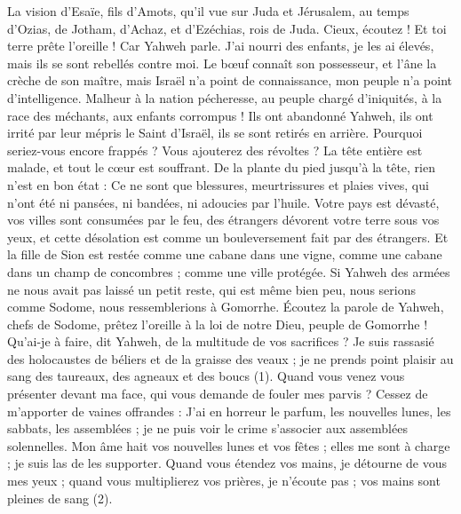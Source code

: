 \BFont
\begin{multicols}{2}
\VerseOne{}La vision d'Esaïe, fils d'Amots, qu’il vue sur Juda et Jérusalem, au temps d’Ozias, de Jotham, d'Achaz, et d'Ezéchias, rois de Juda.
Cieux, écoutez ! Et toi terre prête l'oreille ! Car Yahweh parle. J’ai nourri des enfants, je les ai élevés, mais ils se sont rebellés contre moi.
Le bœuf connaît son possesseur, et l'âne la crèche de son maître, mais Israël n'a point de connaissance, mon peuple n'a point d'intelligence.
Malheur à la nation pécheresse, au peuple chargé d'iniquités, à la race des méchants, aux enfants corrompus ! Ils ont abandonné Yahweh, ils ont irrité par leur mépris le Saint d'Israël, ils se sont retirés en arrière.
Pourquoi seriez-vous encore frappés ? Vous ajouterez des révoltes ? La tête entière est malade, et tout le cœur est souffrant.
De la plante du pied jusqu'à la tête, rien n’est en bon état : Ce ne sont que blessures, meurtrissures et plaies vives, qui n'ont été ni pansées, ni bandées, ni adoucies par l’huile.
Votre pays est dévasté, vos villes sont consumées par le feu, des étrangers dévorent votre terre sous vos yeux, et cette désolation est comme un bouleversement fait par des étrangers.
Et la fille de Sion est restée comme une cabane dans une vigne, comme une cabane dans un champ de concombres ; comme une ville protégée.
Si Yahweh des armées ne nous avait pas laissé un petit reste, qui est même bien peu, nous serions comme Sodome, nous ressemblerions à Gomorrhe.
Écoutez la parole de Yahweh, chefs de Sodome, prêtez l'oreille à la loi de notre Dieu, peuple de Gomorrhe !
Qu'ai-je à faire, dit Yahweh, de la multitude de vos sacrifices ? Je suis rassasié des holocaustes de béliers et de la graisse des veaux ; je ne prends point plaisir au sang des taureaux, des agneaux et des boucs (1).
Quand vous venez vous présenter devant ma face, qui vous demande de fouler mes parvis ?
Cessez de m'apporter de vaines offrandes : J’ai en horreur le parfum, les nouvelles lunes, les sabbats, les assemblées ; je ne puis voir le crime s’associer aux assemblées solennelles.
Mon âme hait vos nouvelles lunes et vos fêtes ; elles me sont à charge ; je suis las de les supporter.
Quand vous étendez vos mains, je détourne de vous mes yeux ; quand vous multiplierez vos prières, je n’écoute pas ; vos mains sont pleines de sang (2).

\end{multicols}
